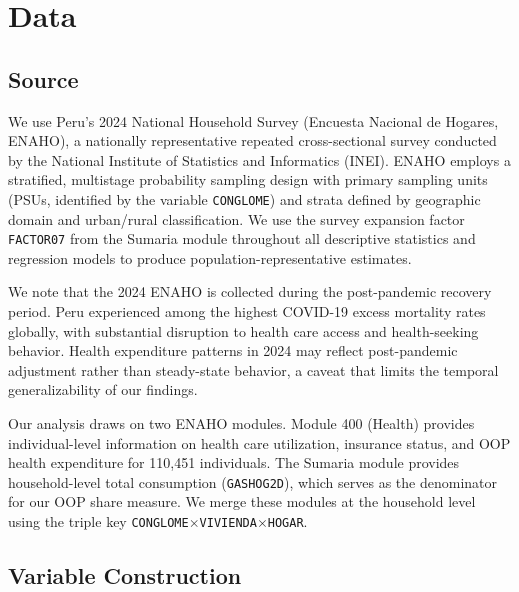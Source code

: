 \section{Data}\label{sec:data}

\subsection{Source}

We use Peru's 2024 National Household Survey (Encuesta Nacional de Hogares, ENAHO), a nationally representative repeated cross-sectional survey conducted by the National Institute of Statistics and Informatics (INEI). ENAHO employs a stratified, multistage probability sampling design with primary sampling units (PSUs, identified by the variable \texttt{CONGLOME}) and strata defined by geographic domain and urban/rural classification. We use the survey expansion factor \texttt{FACTOR07} from the Sumaria module throughout all descriptive statistics and regression models to produce population-representative estimates.

We note that the 2024 ENAHO is collected during the post-pandemic recovery period. Peru experienced among the highest COVID-19 excess mortality rates globally, with substantial disruption to health care access and health-seeking behavior. Health expenditure patterns in 2024 may reflect post-pandemic adjustment rather than steady-state behavior, a caveat that limits the temporal generalizability of our findings.

Our analysis draws on two ENAHO modules. Module 400 (Health) provides individual-level information on health care utilization, insurance status, and OOP health expenditure for 110,451 individuals. The Sumaria module provides household-level total consumption (\texttt{GASHOG2D}), which serves as the denominator for our OOP share measure. We merge these modules at the household level using the triple key \texttt{CONGLOME}$\times$\texttt{VIVIENDA}$\times$\texttt{HOGAR}.

\subsection{Variable Construction}

